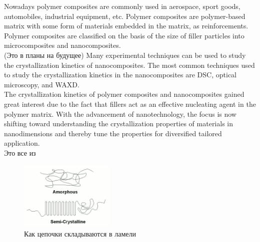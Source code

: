 Nowadays polymer composites are commonly used in aerospace, sport goods, automobiles,
industrial equipment, etc. Polymer composites are polymer-based matrix
with some form of materials embedded in the matrix, as reinforcements.\\
Polymer composites are classified on the basis of the size of filler particles into
microcomposites and nanocomposites.\\
(Это в планы на будущее)
Many experimental techniques can be used to study the crystallization
kinetics of nanocomposites. The most common techniques used to study the
crystallization kinetics in the nanocomposites are DSC, optical microscopy, and
WAXD.\\
The crystallization
kinetics of polymer composites and nanocomposites gained great interest due to the
fact that fillers act as an effective nucleating agent in the polymer matrix. With the
advancement of nanotechnology, the focus is now shifting toward understanding
the crystallization properties of materials in nanodimensions and thereby tune the
properties for diversified tailored application.\\

Это все из \cite{cryst1}

	\begin{figure} 
\vspace{-20pt}


  \begin{center}
    \includegraphics[width=0.4\textwidth]{fig/crystal-1.png}
    \caption{Как цепочки складываются в ламели}
    \label{fig:crystal-1}
  \end{center}
  \vspace{-20pt}
  \vspace{1pt}
\end{figure}






